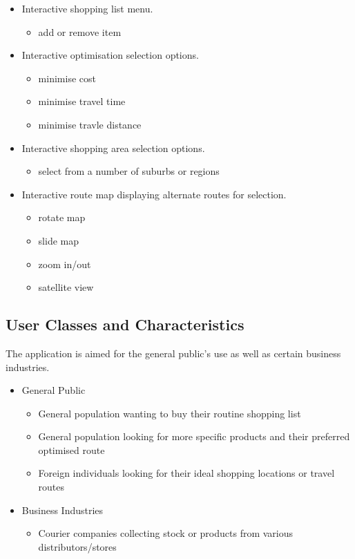 \documentclass[10pt, a4paper, onecolumn]{scrartcl}
\begin{document}
			\begin{itemize}
				\item Interactive shopping list menu.
				\begin{itemize}
					\item add or remove item
				\end{itemize}
				\item Interactive optimisation selection options.
				\begin{itemize}
					\item minimise cost
					\item minimise travel time
					\item minimise travle distance
				\end{itemize}
				\item Interactive shopping area selection options.
				\begin{itemize}
					\item select from a number of suburbs or regions
				\end{itemize}
				\item Interactive route map displaying alternate routes for selection.
				\begin{itemize}
					\item rotate map
					\item slide map
					\item zoom in/out
					\item satellite view
				\end{itemize}
			\end{itemize}
		
		\subsection{User Classes and Characteristics}
		
			The application is aimed for the general public's use as well as certain business industries. 
			
			\begin{itemize}
				\item General Public
				\begin{itemize}
					\item General population wanting to buy their routine shopping list
					\item General population looking for more specific products and their preferred optimised route
					\item Foreign individuals looking for their ideal shopping locations or travel routes
				\end{itemize}
				\item Business Industries
				\begin{itemize}
					\item Courier companies collecting stock or products from various distributors/stores
				\end{itemize}
			\end{itemize}
		
\end{document}

